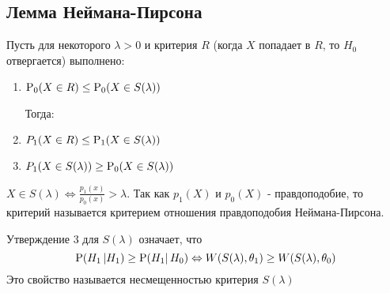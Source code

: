 \subsection{Лемма Неймана-Пирсона}
Пусть для некоторого \(\lambda > 0\) и критерия \(R\)
(когда \(X\) попадает в \(R\), то \(H_0\) отвергается)
выполнено:
\begin{enumerate}
    \item  \(\P_0(X\in R) \leq \P_0(X\in S(\lambda))\)

    Тогда:
    \item  \(P_1(X\in R) \leq \P_1(X\in S(\lambda))\)
    \item  \(P_1(X\in S(\lambda)) \geq \P_0(X\in S(\lambda))\)
\end{enumerate}
\begin{remark}
    \(X\in S(\lambda) \Leftrightarrow \frac{p_1(x)}{p_0(x)} > \lambda\).
    Так как \(p_1(X)\) и \(p_0(X)\) - правдоподобие, то критерий
    называется критерием отношения правдоподобия Неймана-Пирсона.
\end{remark}
\begin{remark}
    Утверждение 3 для \(S(\lambda)\)
    означает, что
    \[\P(H_1 \left\lvert  H_1) \geq \P(H_1 \right\rvert H_0) \Leftrightarrow W(S(\lambda), \theta_1) \geq W(S(\lambda), \theta_0)\]
    Это свойство называется несмещенностью критерия \(S(\lambda)\)
\end{remark}

